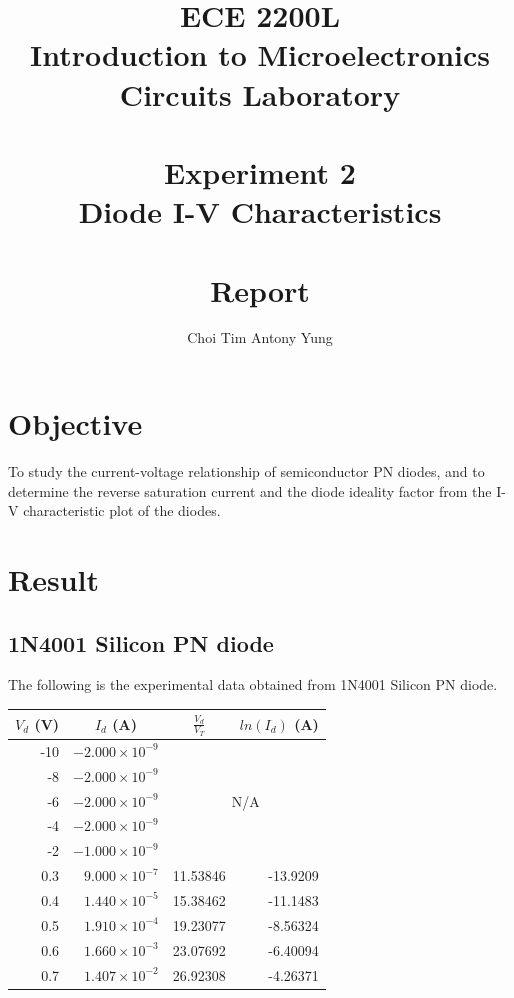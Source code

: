 \documentclass{article}
\title{ECE 2200L\\Introduction to Microelectronics Circuits Laboratory\\\,\\Experiment 2\\Diode I-V Characteristics\\\,\\Report}
\author{Choi Tim Antony Yung}
\begin{document}
\maketitle

\thispagestyle{empty}
\setcounter{page}{0}

\newpage

\section*{Objective}

To study the current-voltage relationship of semiconductor PN diodes, and to determine the reverse saturation current and the diode ideality factor from the I-V characteristic plot of the diodes.

\section*{Result}
\subsection*{1N4001 Silicon PN diode}
The following is the experimental data obtained from 1N4001 Silicon PN diode.
\begin{table}[H]
  \centering
    \begin{tabular}{rrrr}
    \toprule
    \multicolumn{1}{c}{$V_d$ (V)} & \multicolumn{1}{c}{$I_d$ (A)} & \multicolumn{1}{c}{$\frac{V_d}{V_T}$} & \multicolumn{1}{c}{$ln(I_d)$ (A)} \\
    \midrule
    -10   & $-2.000\times10^{-9}$ & \multicolumn{2}{c}{\multirow{5}[0]{*}{N/A}} \\
    -8    & $-2.000\times10^{-9}$ & \multicolumn{2}{c}{} \\
    -6    & $-2.000\times10^{-9}$ & \multicolumn{2}{c}{} \\
    -4    & $-2.000\times10^{-9}$ & \multicolumn{2}{c}{} \\
    -2    & $-1.000\times10^{-9}$ & \multicolumn{2}{c}{} \\
    0.3   & $ 9.000\times10^{-7}$ & 11.53846 & -13.9209 \\
    0.4   & $ 1.440\times10^{-5}$ & 15.38462 & -11.1483 \\
    0.5   & $ 1.910\times10^{-4}$ & 19.23077 & -8.56324 \\
    0.6   & $ 1.660\times10^{-3}$ & 23.07692 & -6.40094 \\
    0.7   & $ 1.407\times10^{-2}$ & 26.92308 & -4.26371 \\
    \bottomrule
  \end{tabular}
\end{table}
\end{document}
